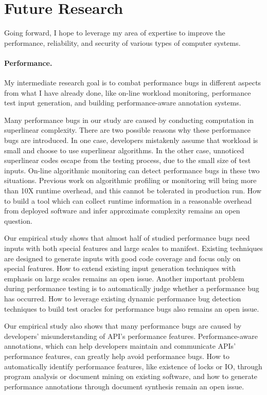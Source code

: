 \documentclass[10pt]{article}
\begin{document}
\vspace{-.1in}
\section{Future Research}

Going forward, I hope to leverage my area of expertise to improve the performance, 
reliability, and security of various types of computer systems.


\vspace{-.1in}
\paragraph{Performance.} My intermediate research goal is to combat performance bugs 
in different aspects from what I have already done, 
like on-line workload monitoring, performance test input generation, 
and building performance-aware annotation systems. 


Many performance bugs in our study are caused by conducting computation in superlinear complexity. 
There are two possible reasons why these performance bugs are introduced. 
In one case, developers mistakenly assume that workload is small and choose to use superlinear algorithms. 
In the other case, unnoticed superlinear codes escape from the testing process, due to the small size of test inputs. 
On-line algorithmic monitoring can detect performance bugs in these two situations. 
Previous work on algorithmic profiling or monitoring will bring more than 10X runtime overhead, and this cannot be tolerated in production run. 
How to build a tool which can collect runtime information in a reasonable overhead from deployed software and infer approximate complexity remains an open question. 

Our empirical study shows that almost half of studied performance bugs need inputs with both special features and large scales to manifest. 
Existing techniques are designed to generate inputs with good code coverage and focus only on special features.
How to extend existing input generation techniques with emphasis on large scales remains an open issue. 
Another important problem during performance testing is to automatically judge whether a performance bug has occurred. 
How to leverage existing dynamic performance bug detection techniques to build test oracles for performance bugs also remains an open issue.

Our empirical study also shows that many performance bugs are caused by developers' misunderstanding of API's performance features. 
Performance-aware annotations, which can help developers maintain and communicate APIs’ performance features, 
can greatly help avoid performance bugs. 
How to automatically identify performance features, like existence of locks or IO, 
through program analysis or document mining on existing software, 
and how to generate performance annotations through document synthesis remain an open issue. 








\newpage


\end{document}
